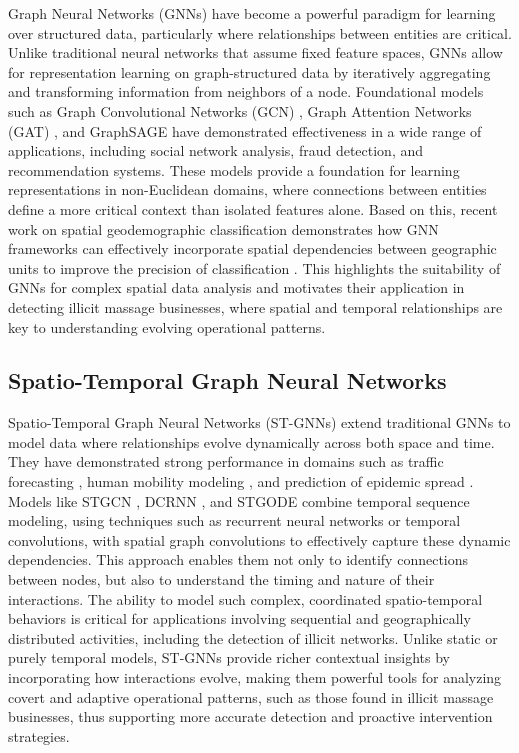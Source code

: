 \documentclass[letterpaper]{article} %
\begin{document}
Graph Neural Networks (GNNs) have become a powerful paradigm for learning over structured data, particularly where relationships between entities are critical. Unlike traditional neural networks that assume fixed feature spaces, GNNs allow for representation learning on graph-structured data by iteratively aggregating and transforming information from neighbors of a node. Foundational models such as Graph Convolutional Networks (GCN) \cite{kipf2017semi}, Graph Attention Networks (GAT) \cite{velickovic2018graph}, and GraphSAGE \cite{hamilton2017inductive} have demonstrated effectiveness in a wide range of applications, including social network analysis, fraud detection, and recommendation systems. These models provide a foundation for learning representations in non-Euclidean domains, where connections between entities define a more critical context than isolated features alone. Based on this, recent work on spatial geodemographic classification demonstrates how GNN frameworks can effectively incorporate spatial dependencies between geographic units to improve the precision of classification \cite{DeSabbata02122023}. This highlights the suitability of GNNs for complex spatial data analysis and motivates their application in detecting illicit massage businesses, where spatial and temporal relationships are key to understanding evolving operational patterns.


\subsection{Spatio-Temporal Graph Neural Networks}

Spatio-Temporal Graph Neural Networks (ST-GNNs) extend traditional GNNs to model data where relationships evolve dynamically across both space and time. They have demonstrated strong performance in domains such as traffic forecasting \cite{10.1007/978-3-031-78255-8_9}, human mobility modeling \cite{yu2018spatio}, and prediction of epidemic spread \cite{li2018diffusion}. Models like STGCN \cite{yu2018spatio}, DCRNN \cite{li2018diffusion}, and STGODE \cite{zhao2023learning} combine temporal sequence modeling, using techniques such as recurrent neural networks or temporal convolutions, with spatial graph convolutions to effectively capture these dynamic dependencies. This approach enables them not only to identify connections between nodes, but also to understand the timing and nature of their interactions. The ability to model such complex, coordinated spatio-temporal behaviors is critical for applications involving sequential and geographically distributed activities, including the detection of illicit networks. Unlike static or purely temporal models, ST-GNNs provide richer contextual insights by incorporating how interactions evolve, making them powerful tools for analyzing covert and adaptive operational patterns, such as those found in illicit massage businesses, thus supporting more accurate detection and proactive intervention strategies.
\end{document}
